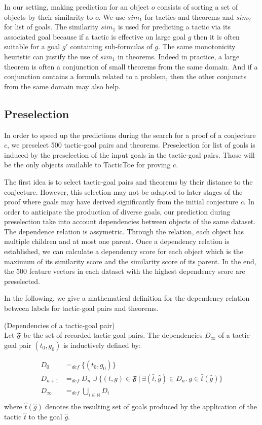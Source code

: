 \documentclass[runningheads,a4paper,draft]{svjour3}
\def\tactictoe{\textsf{TacticToe}\xspace}
\begin{document}
In our setting, making prediction for an object $o$ consists of sorting a set 
of objects by their similarity to $o$. We use $sim_1$ for tactics and theorems 
and $sim_2$ for list of goals. The similarity $sim_1$ is used for predicting a 
tactic via its associated goal because if a
tactic is effective on large goal $g$ then it is often suitable for a goal $g'$ 
containing sub-formulas of $g$. The same monotonicity heuristic can justify the 
use of $sim_1$ in theorems. Indeed in practice, a large theorem is often a 
conjunction of small theorems from the same domain. And if a conjunction 
contains a formula related to a problem, then the other conjuncts 
from the same domain may also help.

\subsection{Preselection}\label{sec:dependencies}

In order to speed up the predictions during the search for a proof of a 
conjecture $c$, we preselect 500 tactic-goal pairs and theorems. 
Preselection for list of goals is induced by the preselection of the input 
goals in the tactic-goal pairs. Those will 
be the only objects available to \tactictoe for proving $c$.

The first idea is to select tactic-goal pairs and theorems by their distance to 
the conjecture. However, this selection may not be adapted to later stages of 
the proof where goals may have derived significantly from the 
initial conjecture $c$. In order to 
anticipate the production of diverse goals, our prediction during preselection 
take into account dependencies between objects of the same dataset.
The dependence relation is assymetric. Through the relation, each object has 
multiple children and at most one parent.
Once a dependency relation is established, we can calculate a dependency score 
for each object which is the maximum of its similarity score and the similarity 
score of its parent. In the end, the 500 feature vectors in each dataset with 
the highest dependency score are preselected.

In the following, we give a mathematical definition for the dependency relation 
between labels for tactic-goal pairs and theorems.

\begin{definition}(Dependencies of a tactic-goal pair)\\
Let $\mathfrak{F}$ be the set of recorded tactic-goal pairs.
The dependencies $D_\infty$ of a tactic-goal pair $(t_0,g_0)$ is 
inductively defined by:

\begin{align*}
D_0 &=_{def} \lbrace (t_0,g_0) \rbrace \\
D_{n+1} &=_{def} D_n \cup \lbrace (t,g)\in \mathfrak{F}\  |\ \exists 
(\hat{t},\hat{g}) \in D_n.\ g \in \hat{t}(\hat{g}) \rbrace  \\
D_\infty &=_{def} \bigcup_{i \in \mathbb{N}} D_i\\
\end{align*}
where $\hat{t}(\hat{g})$ denotes the resulting set of goals produced by the 
application 
of the tactic $\hat{t}$ to the goal $\hat{g}$.
\end{definition}
\end{document}

